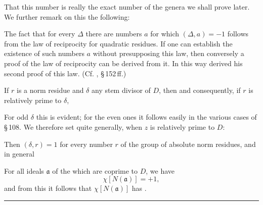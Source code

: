 That this number is really the exact number of the genera we shall prove later. We further remark on this the following:

The fact that for every $\Delta$ there are numbers $a$ for which $(\Delta, a) = -1$ follows from the law of reciprocity for quadratic residues. If one can establish the existence of such numbers $a$ without presupposing this law, then conversely a proof of the law of reciprocity can be derived from it. In this way  derived his second proof of this law. (Cf. , \S\,152\,ff.)

If $r$ is a norm residue and $\delta$ any stem divisor of $D$, then
and consequently, if $r$ is relatively prime to $\delta$,

For odd $\delta$ this is evident; for the even ones it follows easily in the various cases of \S\,108. We therefore set quite generally, when $z$ is relatively prime to $D$:

Then $(\delta, r) = 1$ for every number $r$ of the group of absolute norm residues, and in general

For all ideals $\mathfrak{a}$ of the  which are coprime to $D$, we have
\[
\chi[N(\mathfrak{a})] = +1,
\]
and from this it follows that $\chi[N(\mathfrak{a})]$ has .


\begin{center}\rule{0.32\linewidth}{0.4pt}\end{center}
